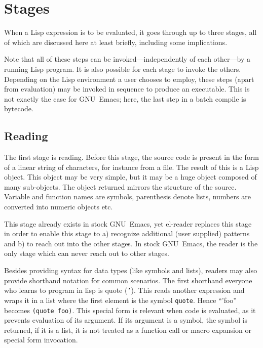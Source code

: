 \documentclass[a4paper,10pt,twoside]{report}
\newcommand{\elr}{el-reader}
\newcommand{\sym}[1]{\texttt{#1}}
\newcommand{\emacs}{GNU~Emacs}
\begin{document}
\section{Stages}
\label{sec:stages}

When a Lisp expression is to be evaluated, it goes through up to three stages,
all of which are discussed here at least briefly, including some implications.

Note that all of these steps can be invoked---independently of each other---by a
running Lisp program.  It is also possible for each stage to invoke the others.
Depending on the Lisp environment a user chooses to
employ, these steps (apart from evaluation) may be invoked in sequence to
produce an executable.  This is not exactly the case for \emacs{}; here, the
last step in a batch compile is bytecode.

\subsection{Reading}
\label{subsec:reading}

The first stage is reading.  Before this stage, the source code is present in
the form of a linear string of characters, for instance from a file.  The result
of this is a Lisp object.  This object may be very simple, but it may be a huge
object composed of many sub-objects.  The object returned mirrors the structure
of the source.  Variable and function names are symbols, parenthesis denote
lists, numbers are converted into numeric objects etc.

This stage already exists in stock \emacs{}, yet \elr{} replaces this stage in
order to enable this stage to a) recognize additional (user supplied) patterns
and b) to reach out into the other stages.  In stock \emacs{}, the reader is the
only stage which can never reach out to other stages.

Besides providing syntax for data types (like symbols and lists), readers may
also provide shorthand notation for common scenarios.  The first shorthand
everyone who learns to program in lisp is quote (\sym{'}).  This reads another
expression and wraps it in a list where the first element is the symbol
\sym{quote}.  Hence ``'foo'' becomes \texttt{(quote foo)}.  This special form is
relevant when code is evaluated, as it prevents evaluation of its argument.  If
its argument is a symbol, the symbol is returned, if it is a list, it is not
treated as a function call or macro expansion or special form invocation.
\end{document}
